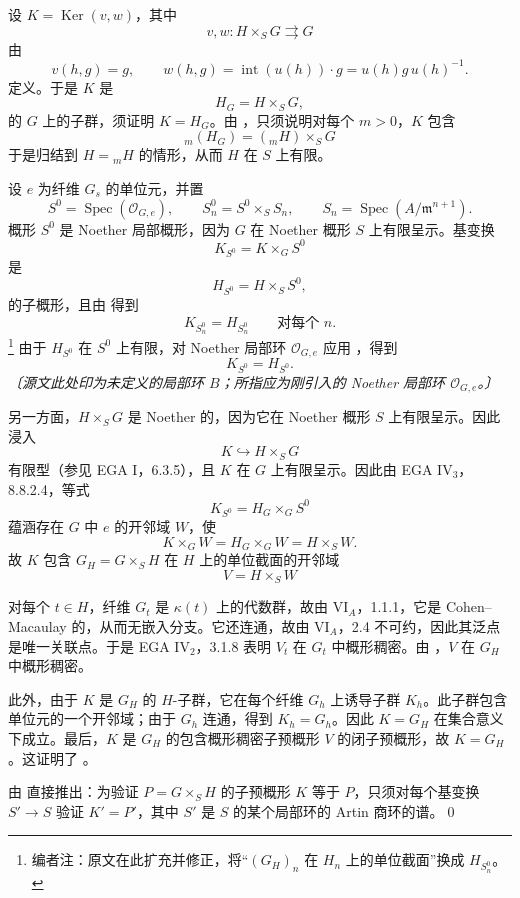 设 \(K=\operatorname{Ker}(v,w)\)，其中
\[
  v,w:H\times_SG\rightrightarrows G
\]
由
\[
  v(h,g)=g,
  \qquad
  w(h,g)=\operatorname{int}(u(h))\cdot g
        =u(h)g\,u(h)^{-1}.
\]
定义。于是 \(K\) 是
\[
  H_G=H\times_SG,
\]
的 \(G\) 上的子群，须证明 \(K=H_G\)。由 ，只须说明对每个 \(m>0\)，\(K\) 包含
\[
  {}_m(H_G)=({}_mH)\times_SG
\]
于是归结到 \(H={}_mH\) 的情形，从而 \(H\) 在 \(S\) 上有限。

设 \(e\) 为纤维 \(G_s\) 的单位元，并置
\[
  S^0=\operatorname{Spec}(\mathscr O_{G,e}),
  \qquad
  S_n^0=S^0\times_SS_n,
  \qquad
  S_n=\operatorname{Spec}(A/\mathfrak m^{n+1}).
\]
概形 \(S^0\) 是 Noether 局部概形，因为 \(G\) 在 Noether 概形 \(S\) 上有限呈示。基变换
\[
  K_{S^0}=K\times_GS^0
\]
是
\[
  H_{S^0}=H\times_SS^0,
\]
的子概形，且由  得到
\[
  K_{S_n^0}=H_{S_n^0}
  \qquad\text{对每个 }n.
\]
\footnote{编者注：原文在此扩充并修正，将“\((G_H)_n\) 在 \(H_n\) 上的单位截面”换成 \(H_{S_n^0}\)。}
由于 \(H_{S^0}\) 在 \(S^0\) 上有限，对 Noether 局部环 \(\mathscr O_{G,e}\) 应用 ，得到
\[
  K_{S^0}=H_{S^0}.
\]
\emph{〔源文此处印为未定义的局部环 \(B\)；所指应为刚引入的 Noether 局部环 \(\mathscr O_{G,e}\)。〕}

另一方面，\(H\times_SG\) 是 Noether 的，因为它在 Noether 概形 \(S\) 上有限呈示。因此浸入
\[
  K\hookrightarrow H\times_SG
\]
有限型（参见 EGA I，6.3.5），且 \(K\) 在 \(G\) 上有限呈示。因此由 EGA IV\(_3\)，8.8.2.4，等式
\[
  K_{S^0}=H_G\times_GS^0
\]
蕴涵存在 \(G\) 中 \(e\) 的开邻域 \(W\)，使
\[
  K\times_GW
  =H_G\times_GW
  =H\times_SW.
\]
故 \(K\) 包含 \(G_H=G\times_SH\) 在 \(H\) 上的单位截面的开邻域
\[
  V=H\times_SW
\]

对每个 \(t\in H\)，纤维 \(G_t\) 是 \(\kappa(t)\) 上的代数群，故由 VI\(_A\)，1.1.1，它是 Cohen--Macaulay 的，从而无嵌入分支。它还连通，故由 VI\(_A\)，2.4 不可约，因此其泛点是唯一关联点。于是 EGA IV\(_2\)，3.1.8 表明 \(V_t\) 在 \(G_t\) 中概形稠密。由 ，\(V\) 在 \(G_H\) 中概形稠密。

此外，由于 \(K\) 是 \(G_H\) 的 \(H\)-子群，它在每个纤维 \(G_h\) 上诱导子群 \(K_h\)。此子群包含单位元的一个开邻域；由于 \(G_h\) 连通，得到 \(K_h=G_h\)。因此 \(K=G_H\) 在集合意义下成立。最后，\(K\) 是 \(G_H\) 的包含概形稠密子预概形 \(V\) 的闭子预概形，故 \(K=G_H\)。这证明了 。

 由  直接推出：为验证 \(P=G\times_SH\) 的子预概形 \(K\) 等于 \(P\)，只须对每个基变换 \(S'\to S\) 验证 \(K'=P'\)，其中 \(S'\) 是 \(S\) 的某个局部环的 Artin 商环的谱。\qed

